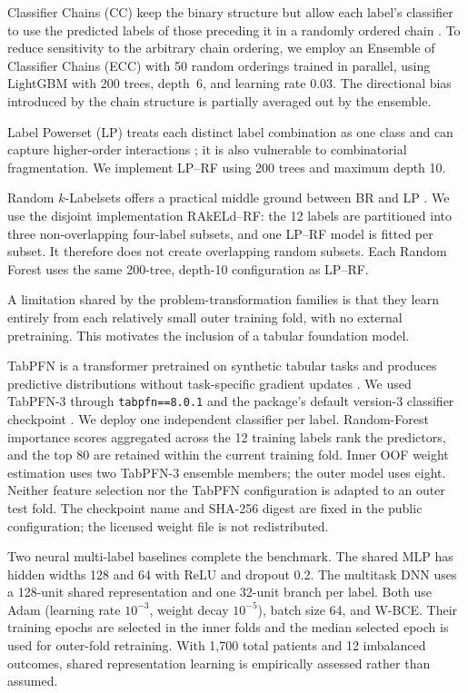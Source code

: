 \documentclass{ieeeaccess}
\begin{document}
Classifier Chains (CC) keep the binary structure but allow each label's classifier to use the predicted labels of those preceding it in a randomly ordered chain \cite{read2011}. To reduce sensitivity to the arbitrary chain ordering, we employ an Ensemble of Classifier Chains (ECC) with 50 random orderings trained in parallel, using LightGBM with 200 trees, depth~6, and learning rate 0.03. The directional bias introduced by the chain structure is partially averaged out by the ensemble.

Label Powerset (LP) treats each distinct label combination as one class and can capture higher-order interactions \cite{tsoumakas2007b}; it is also vulnerable to combinatorial fragmentation. We implement LP--RF using 200 trees and maximum depth 10.

Random $k$-Labelsets offers a practical middle ground between BR and LP \cite{tsoumakas2007}. We use the disjoint implementation RAkELd--RF: the 12 labels are partitioned into three non-overlapping four-label subsets, and one LP--RF model is fitted per subset. It therefore does not create overlapping random subsets. Each Random Forest uses the same 200-tree, depth-10 configuration as LP--RF.

A limitation shared by the problem-transformation families is that they learn entirely from each relatively small outer training fold, with no external pretraining. This motivates the inclusion of a tabular foundation model.

TabPFN is a transformer pretrained on synthetic tabular tasks and produces predictive distributions without task-specific gradient updates \cite{hollmann2025}. We used TabPFN-3 through \texttt{tabpfn==8.0.1} and the package's default version-3 classifier checkpoint  \cite{tabpfn3report}. We deploy one independent classifier per label. Random-Forest importance scores aggregated across the 12 training labels rank the predictors, and the top 80 are retained within the current training fold. Inner OOF weight estimation uses two TabPFN-3 ensemble members; the outer model uses eight. Neither feature selection nor the TabPFN configuration is adapted to an outer test fold. The checkpoint name and SHA-256 digest are fixed in the public configuration; the licensed weight file is not redistributed.

Two neural multi-label baselines complete the benchmark. The shared MLP has hidden widths 128 and 64 with ReLU and dropout 0.2. The multitask DNN uses a 128-unit shared representation and one 32-unit branch per label. Both use Adam (learning rate $10^{-3}$, weight decay $10^{-5}$), batch size 64, and W-BCE. Their training epochs are selected in the inner folds and the median selected epoch is used for outer-fold retraining. With 1,700 total patients and 12 imbalanced outcomes, shared representation learning is empirically assessed rather than assumed.
\end{document}
